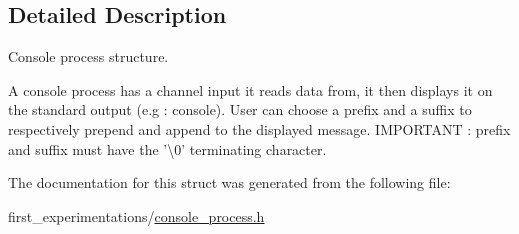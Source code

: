 \subsection{Detailed Description}
Console process structure. 

A console process has a channel input it reads data from, it then displays it on the standard output (e.\-g \-: console). User can choose a prefix and a suffix to respectively prepend and append to the displayed message. I\-M\-P\-O\-R\-T\-A\-N\-T \-: prefix and suffix must have the '\textbackslash{}0' terminating character. 

The documentation for this struct was generated from the following file\-:\begin{DoxyCompactItemize}
\item 
first\-\_\-experimentations/\hyperlink{console__process_8h}{console\-\_\-process.\-h}\end{DoxyCompactItemize}
